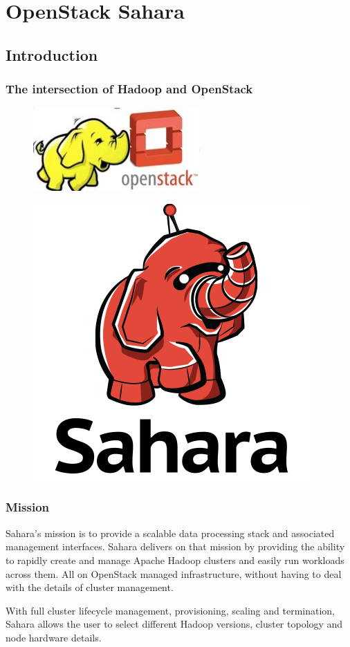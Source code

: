 \section{OpenStack Sahara} 

\subsection{Introduction} 
\begin{frame}
	\frametitle{The intersection of Hadoop and OpenStack}
	\begin{figure}
		\includegraphics[width=0.2\linewidth]{images/hadoop-openstack.jpg}
	\end{figure}
	\begin{figure}
		\includegraphics[width=0.4\linewidth]{images/sahara-logo-square.png}
	\end{figure}
\end{frame}


\begin{frame}
	\frametitle{Mission}
Sahara’s mission is to provide a scalable data processing stack and associated management interfaces. Sahara delivers on that mission by providing the ability to rapidly create and manage Apache Hadoop clusters and easily run workloads across them. All on OpenStack managed infrastructure, without having to deal with the details of cluster management.

With full cluster lifecycle management, provisioning, scaling and termination, Sahara allows the user to select different Hadoop versions, cluster topology and node hardware details.
\end{frame}

